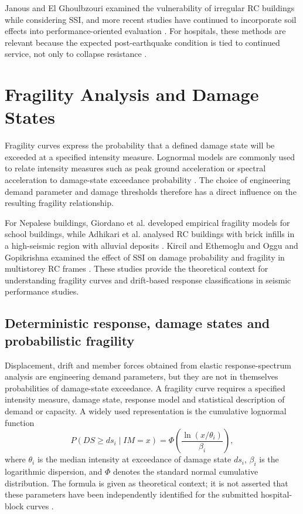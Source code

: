 Janous and El Ghoulbzouri examined the vulnerability of irregular RC buildings while considering SSI, and more recent studies have continued to incorporate soil effects into performance-oriented evaluation \cite{janous2024,oggu2025}. For hospitals, these methods are relevant because the expected post-earthquake condition is tied to continued service, not only to collapse resistance \cite{subedi2022}.

\section{Fragility Analysis and Damage States}
Fragility curves express the probability that a defined damage state will be exceeded at a specified intensity measure. Lognormal models are commonly used to relate intensity measures such as peak ground acceleration or spectral acceleration to damage-state exceedance probability \cite{giordano2021,adhikari2022}. The choice of engineering demand parameter and damage thresholds therefore has a direct influence on the resulting fragility relationship.

For Nepalese buildings, Giordano et al. developed empirical fragility models for school buildings, while Adhikari et al. analysed RC buildings with brick infills in a high-seismic region with alluvial deposits \cite{giordano2021,adhikari2022}. Kircil and Ethemoglu and Oggu and Gopikrishna examined the effect of SSI on damage probability and fragility in multistorey RC frames \cite{kircil2025,oggu2025}. These studies provide the theoretical context for understanding fragility curves and drift-based response classifications in seismic performance studies.

\subsection*{Deterministic response, damage states and probabilistic fragility}
Displacement, drift and member forces obtained from elastic response-spectrum analysis are engineering demand parameters, but they are not in themselves probabilities of damage-state exceedance. A fragility curve requires a specified intensity measure, damage state, response model and statistical description of demand or capacity. A widely used representation is the cumulative lognormal function
\begin{equation}
P(DS\geq ds_i\mid IM=x)=\Phi\!\left(\frac{\ln(x/\theta_i)}{\beta_i}\right),
\label{eq:fragility_lognormal}
\end{equation}
where $\theta_i$ is the median intensity at exceedance of damage state $ds_i$, $\beta_i$ is the logarithmic dispersion, and $\Phi$ denotes the standard normal cumulative distribution. The formula is given as theoretical context; it is not asserted that these parameters have been independently identified for the submitted hospital-block curves \cite{giordano2021,adhikari2022}.


